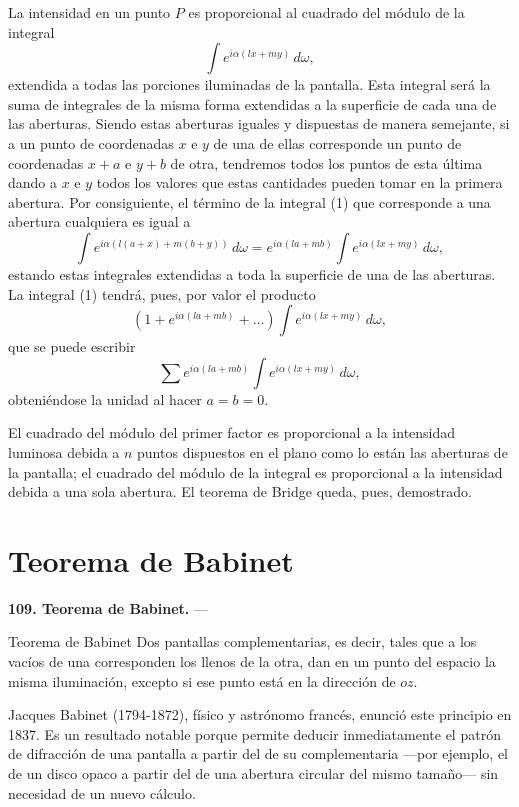 La intensidad en un punto $P$ es proporcional al cuadrado del módulo de
la integral
\begin{equation}
\int e^{i\alpha(lx+my)}\,d\omega,
\tag{1}
\end{equation}
extendida a todas las porciones iluminadas de la pantalla. Esta integral
será la suma de integrales de la misma forma extendidas a la superficie
de cada una de las aberturas. Siendo estas aberturas iguales y dispuestas
de manera semejante, si a un punto de coordenadas $x$ e $y$ de una de
ellas corresponde un punto de coordenadas $x+a$ e $y+b$ de otra,
tendremos todos los puntos de esta última dando a $x$ e $y$ todos los
valores que estas cantidades pueden tomar en la primera abertura. Por
consiguiente, el término de la integral (1) que corresponde a una
abertura cualquiera es igual a
\[
\int e^{i\alpha(l(a+x)+m(b+y))}\,d\omega
= e^{i\alpha(la+mb)}\int e^{i\alpha(lx+my)}\,d\omega,
\]
estando estas integrales extendidas a toda la superficie de una de las
aberturas. La integral (1) tendrá, pues, por valor el producto
\[
\left(1+e^{i\alpha(la+mb)}+\ldots\right)\int e^{i\alpha(lx+my)}\,d\omega,
\]
que se puede escribir
\[
\sum e^{i\alpha(la+mb)}\int e^{i\alpha(lx+my)}\,d\omega,
\]
obteniéndose la unidad al hacer $a=b=0$.

El cuadrado del módulo del primer factor es proporcional a la intensidad
luminosa debida a $n$ puntos dispuestos en el plano como lo están las
aberturas de la pantalla; el cuadrado del módulo de la integral es
proporcional a la intensidad debida a una sola abertura. El teorema de
Bridge queda, pues, demostrado.

\section{Teorema de Babinet}

\noindent\textbf{109. Teorema de Babinet.} —

\begin{enunciado}{Teorema de Babinet}
Dos pantallas complementarias, es decir, tales que a los vacíos de una
corresponden los llenos de la otra, dan en un punto del espacio la misma
iluminación, excepto si ese punto está en la dirección de $oz$.
\end{enunciado}

\begin{notahistorica}
Jacques Babinet (1794-1872), físico y astrónomo francés, enunció este
principio en 1837. Es un resultado notable porque permite deducir
inmediatamente el patrón de difracción de una pantalla a partir del de su
complementaria —por ejemplo, el de un disco opaco a partir del de una
abertura circular del mismo tamaño— sin necesidad de un nuevo cálculo.
\end{notahistorica}

